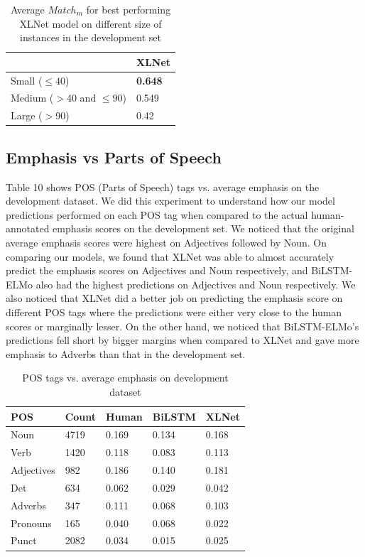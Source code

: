 \documentclass[letterpaper]{article}
\begin{document}
\begin{table}[h!]
\centering
\begin{adjustbox}{width=0.76\columnwidth}
\begin{tabular}{|l|l|}
\hline
& \textbf{XLNet} \\
\hline
Small ($\leq40$) & \textbf{0.648}  \\
\hline
Medium ($>$40 and $\leq90$) & 0.549 \\
\hline
Large ($>$90) & 0.42 \\
\hline
\end{tabular}
\end{adjustbox}
\caption{Average $Match_m$ for best performing XLNet model on different size of instances in the development set}
\label{table:8}
\end{table}

\subsection{Emphasis vs Parts of Speech}
Table 10 shows POS (Parts of Speech) tags vs. average emphasis on the development dataset. We did this experiment to understand how our model predictions performed on each POS tag when compared to the actual human-annotated emphasis scores on the development set. We noticed that the original average emphasis scores were highest on Adjectives followed by Noun. On comparing our models, we found that XLNet was able to almost accurately predict the emphasis scores on Adjectives and Noun respectively, and BiLSTM-ELMo also had the highest predictions on Adjectives and Noun respectively. We also noticed that XLNet did a better job on predicting the emphasis score on different POS tags where the predictions were either very close to the human scores or marginally lesser. On the other hand, we noticed that BiLSTM-ELMo's predictions fell short by bigger margins when compared to XLNet and gave more emphasis to Adverbs than that in the development set.

\begin{table}[h!]
\centering
\begin{adjustbox}{width=0.51\columnwidth}
\begin{tabular}{|l|l|l|l|l|}
\hline
\textbf{POS} & \textbf{Count} & \textbf{Human} & \textbf{BiLSTM} & \textbf{XLNet} \\
\hline
Noun & 4719 & 0.169 & 0.134 & 0.168 \\
\hline
Verb & 1420 & 0.118 & 0.083 & 0.113 \\
\hline
Adjectives & 982 & 0.186 & 0.140 & 0.181 \\
\hline
Det & 634 & 0.062 & 0.029 & 0.042 \\
\hline
Adverbs & 347 & 0.111 & 0.068 & 0.103 \\
\hline
Pronouns & 165 & 0.040 & 0.068 & 0.022 \\
\hline
Punct & 2082 & 0.034 & 0.015 & 0.025 \\
\hline
\end{tabular}
\end{adjustbox}
\caption{POS tags vs. average emphasis on development dataset}
\label{table:9}
\end{table}
\end{document}
